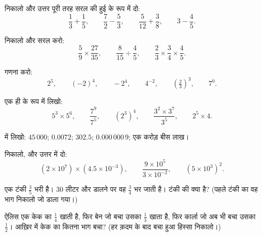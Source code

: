 \begin{exercise}[$\star$]\label{exo:g9:fractions:1}
निकालो और उत्तर पूरी तरह सरल की हुई  के रूप में दो:
\[
\frac13 + \frac15, \qquad
\frac72 - \frac53, \qquad
\frac{5}{12} + \frac38, \qquad
3 - \frac45 .
\]
\end{exercise}

\begin{exercise}[$\star$]\label{exo:g9:fractions:2}
निकालो और सरल करो:
\[
\frac59 \times \frac{27}{35}, \qquad
\frac{8}{15} \div \frac{4}{5}, \qquad
\frac23 \times \frac34 \times \frac45 .
\]
\end{exercise}

\begin{exercise}[$\star$]\label{exo:g9:fractions:3}
गणना करो:
\[
2^5, \qquad (-2)^4, \qquad -2^4, \qquad 4^{-2}, \qquad
\left(\tfrac23\right)^3, \qquad 7^0 .
\]
\end{exercise}

\begin{exercise}[$\star$]\label{exo:g9:fractions:4}
एक ही  के रूप में लिखो:
\[
5^3 \times 5^6, \qquad
\frac{7^9}{7^5}, \qquad
\left(2^3\right)^4, \qquad
\frac{3^2 \times 3^7}{3^5}, \qquad
2^5 \times 4 .
\]
\end{exercise}

\begin{exercise}[$\star$]\label{exo:g9:fractions:5}
 में लिखो: $45\,000$; $0.0072$; $302.5$;
$0.000\,000\,9$; एक करोड़ बीस लाख।
\end{exercise}

\begin{exercise}[$\star\star$]\label{exo:g9:fractions:6}
निकालो, और उत्तर  में दो:
\[
(2 \times 10^7) \times (4.5 \times 10^{-3}),
\qquad
\frac{9 \times 10^5}{3 \times 10^{-2}},
\qquad
(5 \times 10^3)^2 .
\]
\end{exercise}

\begin{exercise}[$\star\star$]\label{exo:g9:fractions:7}
एक टंकी $\frac35$ भरी है। $30$ लीटर और डालने पर वह $\frac34$ भर
जाती है। टंकी की  क्या है? (पहले टंकी का वह भाग निकालो जो
डाला गया।)
\end{exercise}

\begin{exercise}[$\star\star$]\label{exo:g9:fractions:8}
ऐलिस एक केक का $\frac14$ खाती है, फिर बेन जो बचा उसका $\frac13$
खाता है, फिर कार्ला जो अब भी बचा उसका $\frac12$। आख़िर में केक का
कितना भाग बचा? (हर क़दम के बाद बचा हुआ हिस्सा निकालो।)
\end{exercise}

